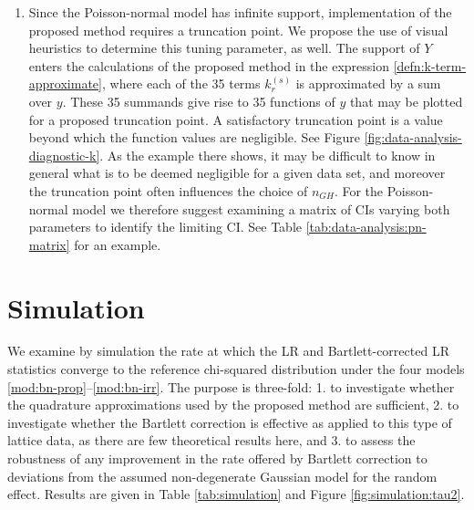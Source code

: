 \documentclass[12pt]{article}
\newcommand{\Y}{Y}
\newcommand{\y}{y}
\renewcommand{\k}{k}
\newcommand{\kterm}{\k_r^{(s)}}
\newcommand{\nGH}{n_{GH}}
\newcommand{\comment}[2][red]{%
 \iftoggle{commenttoggle}{%
  {\normalsize{\color{#1}{#2}}\normalsize}%
 }{%
 }%
}
\begin{document}
\begin{enumerate}
\item Since the Poisson-normal model has infinite support,
  implementation of the proposed method requires a truncation
  point. We propose the use of visual heuristics to determine this
  tuning parameter, as well. The support of $\Y$ enters the
  calculations of the proposed method in the expression \eqref{defn:k-term-approximate}, where
  each of the 35 terms $\kterm$ is approximated by a sum over
  $\y$. These 35 summands give rise to 35 functions of $\y$ that may be
  plotted for a proposed truncation point. A satisfactory truncation
  point is a value beyond which the function values are
  negligible. See Figure \ref{fig:data-analysis-diagnostic-k}. As the
  example there shows, it may be difficult to know in general what is
  to be deemed negligible for a given data set, and moreover the
  truncation point often influences the choice of $\nGH$.
  For the Poisson-normal model we therefore suggest
  examining a matrix of CIs varying both parameters to identify the
  limiting CI. See Table \ref{tab:data-analysis:pn-matrix} for an example.

\end{enumerate}


\section{Simulation}
\label{sec:simulation}

We examine by simulation the rate at which the LR and
Bartlett-corrected LR statistics converge to the reference chi-squared
distribution under the four models
\eqref{mod:bn-prop}--\eqref{mod:bn-irr}. The purpose is three-fold:
1. to investigate whether the quadrature approximations used by the
proposed method are sufficient, 2. to investigate whether the Bartlett
correction is effective as applied to this type of lattice data, as
there are few theoretical results here, and 3. to assess the
robustness of any improvement in the rate offered by Bartlett
correction to deviations from the assumed non-degenerate Gaussian
model for the random effect. Results are given in Table
\ref{tab:simulation} and Figure \ref{fig:simulation:tau2}.
\end{document}
